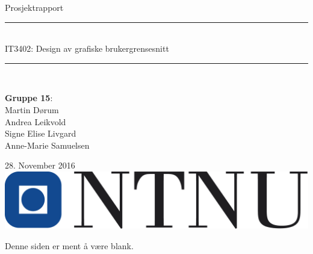 \documentclass{article}
\begin{document}
\begin{center}
\vspace*{4.5cm}
\Huge{Prosjektrapport}\\[2pc]
\vspace{-1.5cm}
\noindent\rule{11cm}{0.8pt}\\

\Large{IT3402: Design av grafiske brukergrensesnitt}\\[1pc]
\vspace{-0.7cm}
\noindent\rule{11cm}{0.8pt}\\
\vspace{3.5cm}

\large{{\textbf{Gruppe 15}: \\
Martin Dørum\\
Andrea Leikvold\\
Signe Elise Livgard\\
Anne-Marie Samuelsen\\
}}
\vspace{2.0cm}

\large{28. November 2016}\\
\vspace{1.0cm}
\includegraphics[scale=0.6]{images/ntnu.png}
\end{center}

\setlength{\parindent}{4em}
\setlength{\parskip}{1em} %
\renewcommand{\baselinestretch}{1.3} %

\thispagestyle{empty}
\newpage
\thispagestyle{empty}
\begin{center}
Denne siden er ment å være blank.
\end{center}
\null\newpage
\setcounter{page}{1}

\tableofcontents
\newpage
\listoftables
\newpage
\listoffigures
\newpage

\setcounter{page}{1}


\newpage


\newpage


\newpage


\newpage


\newpage


\newpage


\newpage


\newpage


\newpage


\newpage


\end{document}
